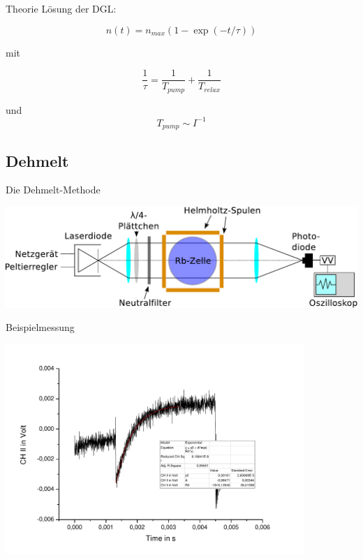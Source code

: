 \documentclass{beamer}
\begin{document}
\begin{frame}{Theorie}
Lösung der DGL:

$$n(t) = n_{max}(1-\exp(-t/\tau))$$

mit

$$\frac{1}{\tau} = \frac{1}{T_{pump}} + \frac{1}{T_{relax}}$$ %

und $$T_{pump} \sim I^{-1}$$ %

\end{frame}

\subsection{Dehmelt}
\begin{frame}{Die Dehmelt-Methode}
\begin{center}
\centering \includegraphics[width=\textwidth]{Bilder/ABDehmelt.pdf}
\end{center}
\end{frame}

\begin{frame}{Beispielmessung}
\begin{center}
\centering \includegraphics[width=0.85\textwidth]{Bilder/DehmeltBsp.pdf}
\end{center}
\end{frame}
\end{document}
